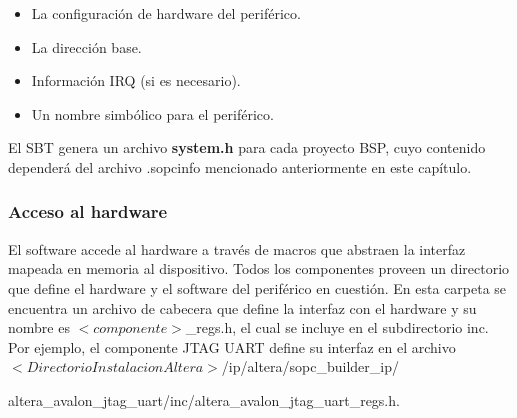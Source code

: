 \begin{itemize}
	\item La configuración de hardware del periférico.
	\item La dirección base.
	\item Información IRQ (si es necesario).
	\item Un nombre simbólico para el periférico.
\end{itemize}

El SBT genera un archivo \textbf{system.h} para cada proyecto BSP, cuyo contenido dependerá del archivo .sopcinfo mencionado anteriormente en este capítulo.

\subsubsection{Acceso al hardware}
El software accede al hardware a través de macros que abstraen la interfaz mapeada en memoria al dispositivo. Todos los componentes proveen un directorio que define el hardware y el software del periférico en cuestión. En esta carpeta se encuentra un archivo de cabecera que define la interfaz con el hardware y su nombre es $<componente>$\_regs.h, el cual se incluye en el subdirectorio inc. Por ejemplo, el componente JTAG UART define su interfaz en el archivo $<Directorio Instalacion Altera>$/ip/altera/sopc\_builder\_ip/

altera\_avalon\_jtag\_uart/inc/altera\_avalon\_jtag\_uart\_regs.h.

